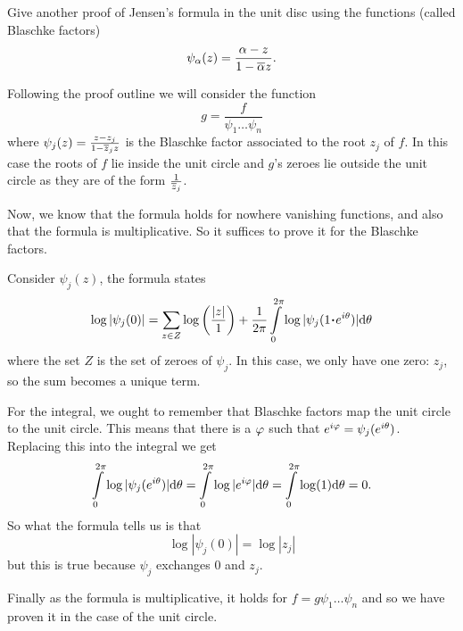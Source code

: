 \documentclass[12pt]{memoir}
\begin{document}
\begin{Ej}
    Give another proof of Jensen's formula in the unit disc using the functions
(called Blaschke factors)
$$\psi_\alpha(z)=\frac{\alpha-z}{1-\overline{\alpha} z}.$$
\end{Ej}

\begin{ptcbr}
    Following the proof outline we will consider the function 
    $$g=\frac{f}{\psi_1\dots\psi_n}$$
    where $\psi_j(z)=\frac{z-z_j}{1-\overline z_j z}$ is the Blaschke factor associated to the root $z_j$ of $f$. In this case the roots of $f$ lie inside the unit circle and $g$'s zeroes lie outside the unit circle as they are of the form $\frac{1}{\overline z_j}$.\par
    Now, we know that the formula holds for nowhere vanishing functions, and also that the formula is multiplicative. So it suffices to prove it for the Blaschke factors.\par 
    Consider $\psi_j(z)$, the formula states 
    $$\log|\psi_j(0)|=\sum_{z\in Z}\log\left(\frac{|z|}{1}\right)+\frac{1}{2\pi}\int\limits_0^{2\pi}\log|\psi_j(1\.e^{i\te})|\dd\te$$
    where the set $Z$ is the set of zeroes of $\psi_j$. In this case, we only have one zero: $z_j$, so the sum becomes a unique term.\par 
    For the integral, we ought to remember that Blaschke factors map the unit circle to the unit circle. This means that there is a $\varphi$ such that $e^{i\varphi}=\psi_j(e^{i\theta})$. Replacing this into the integral we get 
    $$\int\limits_0^{2\pi}\log|\psi_j(e^{i\theta})|\dd\theta=\int\limits_0^{2\pi}\log|e^{i\varphi}|\dd\theta=\int\limits_0^{2\pi}\log(1)\dd\theta=0.$$
    So what the formula tells us is that 
    $$\log|\psi_j(0)|=\log|z_j|$$
    but this is true because $\psi_j$ exchanges $0$ and $z_j$.\par 
    Finally as the formula is multiplicative, it holds for $f=g\psi_1\dots\psi_n$ and so we have proven it in the case of the unit circle.
\end{ptcbr}
\end{document}
